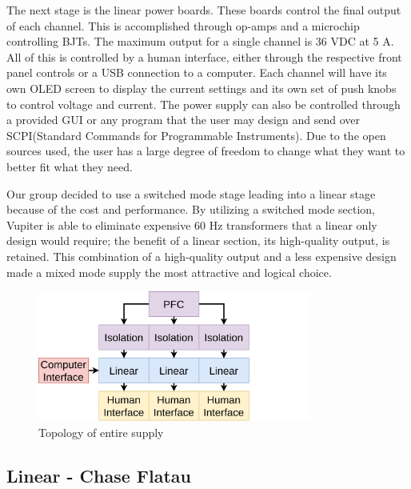 \documentclass[15pt]{article}
\begin{document}
The next stage is the linear power boards. These boards control the final output of each channel. This is accomplished through op-amps and a microchip controlling BJTs. The maximum output for a single channel is 36 VDC at 5 A. All of this is controlled by a human interface, either through the respective front panel controls or a USB connection to a computer. Each channel will have its own OLED screen to display the current settings and its own set of push knobs to control voltage and current. The power supply can also be controlled through a provided GUI or any program that the user may design and send over SCPI(Standard Commands for Programmable Instruments). Due to the open sources used, the user has a large degree of freedom to change what they want to better fit what they need.

Our group decided to use a switched mode stage leading into a linear stage because of the cost and performance. By utilizing a switched mode section, Vupiter is able to eliminate expensive 60 Hz transformers that a linear only design would require; the benefit of a linear section, its high-quality output, is retained. This combination of a high-quality output and a less expensive design made a mixed mode supply the most attractive and logical choice.

\begin{figure}[H]
    \centering
    \includegraphics[width=0.8\textwidth]{chase1}
    \caption{Topology of entire supply}
    \label{fig:chase1}
\end{figure}

\subsection{Linear - Chase Flatau}
\end{document}
